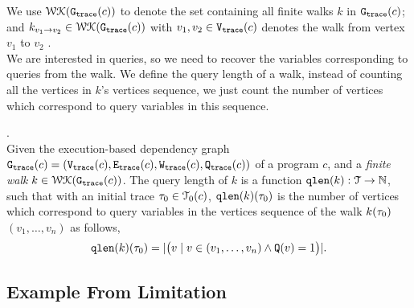 We use $\mathcal{WK}(\mathtt{{G_{trace}}}(c))$ to denote 
the set containing all finite walks $k$ in $\mathtt{{G_{trace}}}(c)$;
and $k_{v_1 \to v_2} \in \mathcal{WK}(\mathtt{{G_{trace}}}(c))$ with $v_1, v_2 \in \mathtt{{V_{trace}}}(c)$ denotes the walk from vertex $v_1$ to $v_2$ . 
\\
We are interested in queries, so we need to recover the 
variables corresponding to queries from the walk. We define the query length of a walk, 
instead of counting all 
the vertices in $k$'s vertices sequence, we just count the number of vertices which correspond to query variables in this sequence.
%
\begin{defn}.
\label{def:qlen}
\\
Given 
the execution-based dependency graph $\mathtt{{G_{trace}}}({c}) = (\mathtt{{V_{trace}}}({c}), \mathtt{{E_{trace}}}({c}), \mathtt{{W_{trace}}}({c}), \mathtt{{Q_{trace}}}({c}))$ of a program $c$,
 and a \emph{finite walk} 
 $k \in \mathcal{WK}(\mathtt{{G_{trace}}}(c))$. 
The query length of $k$ is a function $\mathtt{qlen}(k): \mathcal{T} \to \mathbb{N}$, such that with an initial trace  $\mathtt{\tau}_0 \in \mathcal{T}_0(c)$, $\mathtt{qlen}(k)(\mathtt{\tau}_0)$ is
the number of vertices which correspond to query variables in the vertices sequence of the walk $k(\mathtt{\tau}_0)$
$(v_1, \ldots, v_{n})$ as follows, 
\[
  \mathtt{qlen}(k)(\mathtt{\tau}_0) = |\big( v \mid v \in (v_1, \ldots, v_{n}) \land \mathtt{Q}(v) = 1 \big)|.
\]
\end{defn}
%
\subsection{Example From Limitation}
% 
